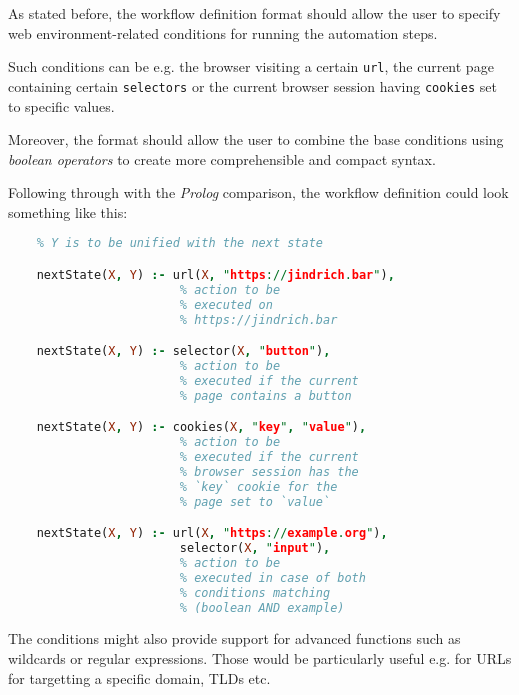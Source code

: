 As stated before, the workflow definition format should allow the user to specify web environment-related conditions for running the automation steps.

Such conditions can be e.g. the browser visiting a certain \texttt{url}, the current page containing certain \texttt{selectors} or the current browser session having \texttt{cookies} set to specific values.

Moreover, the format should allow the user to combine the base conditions using \textit{boolean operators} to create more comprehensible and compact syntax.

Following through with the \textit{Prolog} comparison, the workflow definition could look something like this:

\begin{minipage}{0.95\linewidth}
\begin{lstlisting}[language=prolog, columns=spaceflexible]
    % X is denoting the current state of the browser
    % Y is to be unified with the next state

    nextState(X, Y) :- url(X, "https://jindrich.bar"),
                        % action to be 
                        % executed on 
                        % https://jindrich.bar

    nextState(X, Y) :- selector(X, "button"),
                        % action to be 
                        % executed if the current 
                        % page contains a button

    nextState(X, Y) :- cookies(X, "key", "value"),
                        % action to be 
                        % executed if the current 
                        % browser session has the
                        % `key` cookie for the  
                        % page set to `value`

    nextState(X, Y) :- url(X, "https://example.org"),
                        selector(X, "input"),
                        % action to be 
                        % executed in case of both
                        % conditions matching 
                        % (boolean AND example)

\end{lstlisting}
\end{minipage}

\emptyline

The conditions might also provide support for advanced functions such as wildcards or regular expressions.
Those would be particularly useful e.g. for URLs for targetting a specific domain, TLDs etc.

